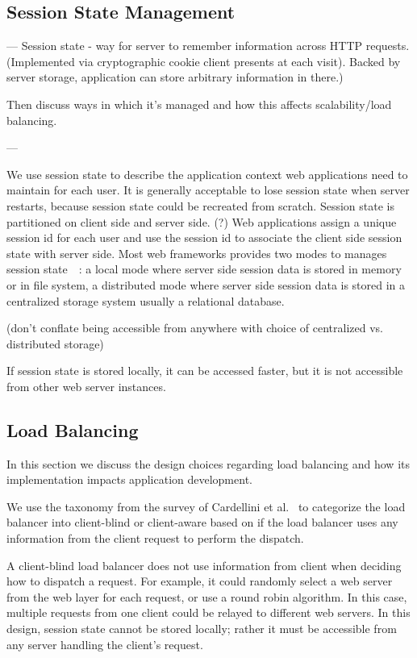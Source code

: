 \subsection{Session State Management}

---
Session state - way for server to remember information across HTTP requests.
(Implemented via cryptographic cookie client presents at each visit).
Backed by server storage, application can store arbitrary information 
in there.)


Then discuss ways in which it's managed and how this affects scalability/load balancing.

---

We use session state to describe the application context
web applications need to maintain for each user.
It is generally acceptable to lose session state
when server restarts,
because session state could be recreated from scratch.
Session state is partitioned on client side and server side. (?)
Web applications assign a unique 
session id for each user and use
the session id to associate the client side session state
with server side.
Most web frameworks provides two modes
to manages session state~\cite{j2eedoc}~\cite{phpdoc}:
a local mode where server side session data is stored
in memory or in file system,
a distributed mode where server side session data
is stored in a centralized storage system usually a
relational database.

(don't conflate being accessible from anywhere with choice of centralized vs. distributed storage)

If session state is stored locally, it can be accessed faster,
but it is not accessible from other web server instances.

\subsection{Load Balancing}

In this section we discuss the design choices regarding load balancing
and how its implementation impacts application development.

We use the taxonomy from the survey of Cardellini et al.~\cite{cardellini2002state}
to categorize the load balancer into client-blind or client-aware based on if
the load balancer uses any information from the client request to perform the dispatch.

A client-blind load balancer does not use information from client when deciding
how to dispatch a request.
For example, it could randomly select a web server from the web layer for each request,
or use a round robin algorithm.
In this case, multiple requests from one client could be relayed to different web servers.
In this design, session state cannot be stored locally; rather it must be accessible 
from any server handling the client's request.

